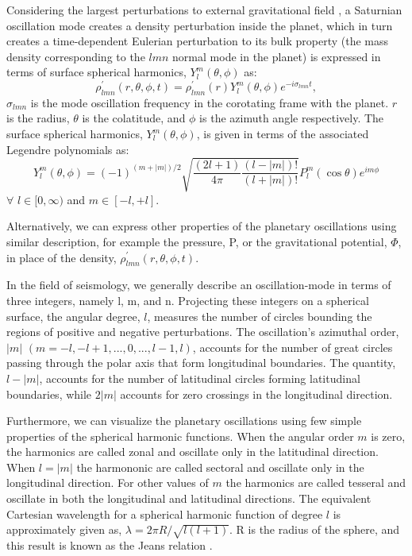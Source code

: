 \documentclass{article}
\begin{document}
Considering the largest perturbations to external gravitational field \cite{article} \cite{Marley1993PlanetaryAM}\cite{Mankovich_2019}, a Saturnian oscillation mode creates a density perturbation inside the planet, which in turn creates a time-dependent Eulerian perturbation to its bulk property (the mass density corresponding
to the $lmn$ normal mode in the planet) is expressed in terms of surface spherical harmonics, $Y_{l}^{m}(\theta,\phi)$ as: 
\begin{equation}
    \rho_{lmn}^{'}(r,\theta,\phi,t) =   \rho_{lmn}^{'}(r)Y_{l}^{m}(\theta,\phi)e^{-i\sigma_{lmn}t},
\end{equation}
$\sigma_{lmn}$ is the mode oscillation frequency in the corotating frame with the planet. $r$ is the radius, $\theta$ is the colatitude, and $\phi$ is the azimuth angle respectively. The surface spherical harmonics, $Y_{l}^{m}(\theta,\phi)$, is given in terms of the associated Legendre polynomials as: 
\begin{equation}
     Y_{l}^{m}(\theta,\phi) = (-1)^{(m+|m|)/2} \sqrt{\frac{(2l+1)}{4\pi}\frac{(l-|m|)!}{(l+|m|)!}}P^{m}_{l} (\cos\theta)e^{im\phi}
\end{equation}
$\forall$  $l \in [0, \infty)$ and $m \in [-l,+l]$.

Alternatively, we can express other properties of the planetary oscillations using similar description, for example the pressure, P, or the gravitational potential, $\Phi$, in place of the density, $\rho_{lmn}^{'}(r,\theta,\phi,t)$.

In the field of seismology, we generally describe an oscillation-mode in terms of three integers, namely l, m, and n. Projecting these integers on a spherical surface, the angular degree, $l$, measures the number of circles bounding the regions of positive and negative perturbations. The oscillation's azimuthal order, $|m|$ $(m = -l, -l+1, ..., 0,..., l-1, l)$, accounts for the number of great circles passing through the polar axis that form longitudinal boundaries. The quantity, $l-|m|$, accounts for the number of latitudinal circles forming latitudinal boundaries, while $2|m|$ accounts for zero crossings in the longitudinal direction. 

Furthermore, we can visualize the planetary oscillations using few simple properties of the spherical harmonic functions. When the angular order $m$ is zero, the harmonics are called zonal and oscillate only in the latitudinal direction. When $l=|m|$ the harmononic are called sectoral and oscillate only in the longitudinal direction.  For other values of $m$ the harmonics are called tesseral and oscillate in both the longitudinal and latitudinal directions. The equivalent Cartesian wavelength for a spherical harmonic function of degree $l$ is approximately given as, $\lambda = 2\pi R/\sqrt{l(l+1)}$. R is the radius of the sphere, and this result is known as the Jeans relation \cite{https://doi.org/10.1029/2018GC007529}.
\end{document}
